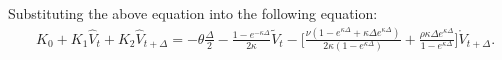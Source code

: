 \documentclass{ws-ijfe}
\begin{document}
Substituting the above equation into the following equation:
\begin{equation}\label{QEK0K1K2}
\begin{split}
&K_0+K_1\hat{V}_t+K_2\hat{V}_{t+\Delta}
=-\theta\frac{\Delta}{2}-\frac{1-e^{-\kappa\Delta}}{2\kappa}\tilde{V}_t-\bigg[\frac{\nu(1-e^{\kappa\Delta}+\kappa\Delta e^{\kappa\Delta})}{2\kappa(1-e^{\kappa\Delta})}+\frac{\rho\kappa\Delta e^{\kappa\Delta}}{1-e^{\kappa\Delta}}\bigg]\mathring{V}_{t+\Delta}.
\end{split}
\end{equation}
\end{document}
